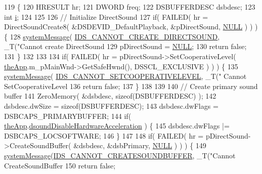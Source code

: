 \begin{DoxyCode}
119 \{
120     HRESULT hr;
121     DWORD freq;
122     DSBUFFERDESC dsbdesc;
123     \textcolor{keywordtype}{int} \mbox{\hyperlink{expr-lex_8cpp_acb559820d9ca11295b4500f179ef6392}{i}};
124 
125 
126     \textcolor{comment}{// Initialize DirectSound}
127     \textcolor{keywordflow}{if}( FAILED( hr = DirectSoundCreate8( &DSDEVID\_DefaultPlayback, &pDirectSound, 
      \mbox{\hyperlink{getopt1_8c_a070d2ce7b6bb7e5c05602aa8c308d0c4}{NULL}} ) ) ) \{
128         \mbox{\hyperlink{system_8cpp_a747a9cb8e015a3d45cca636b5bd0fc69}{systemMessage}}( \mbox{\hyperlink{resource_8h_a2cf080a47bcffd2fc082a28d3a81b8ad}{IDS\_CANNOT\_CREATE\_DIRECTSOUND}}, \_T(\textcolor{stringliteral}{"Cannot
       create DirectSound %
129         pDirectSound = \mbox{\hyperlink{getopt1_8c_a070d2ce7b6bb7e5c05602aa8c308d0c4}{NULL}};
130         \textcolor{keywordflow}{return} \textcolor{keyword}{false};
131     \}
132 
133 
134     \textcolor{keywordflow}{if}( FAILED( hr = pDirectSound->SetCooperativeLevel( \mbox{\hyperlink{_v_b_a_8cpp_a8095a9d06b37a7efe3723f3218ad8fb3}{theApp}}.m\_pMainWnd->GetSafeHwnd(), 
      DSSCL\_EXCLUSIVE ) ) ) \{
135         \mbox{\hyperlink{system_8cpp_a747a9cb8e015a3d45cca636b5bd0fc69}{systemMessage}}( \mbox{\hyperlink{resource_8h_a4df84f3d1f520bb71a7173be8a29d61b}{IDS\_CANNOT\_SETCOOPERATIVELEVEL}}, \_T(\textcolor{stringliteral}{"
      Cannot SetCooperativeLevel %
136         \textcolor{keywordflow}{return} \textcolor{keyword}{false};
137     \}
138 
139 
140     \textcolor{comment}{// Create primary sound buffer}
141     ZeroMemory( &dsbdesc, \textcolor{keyword}{sizeof}(DSBUFFERDESC) );
142     dsbdesc.dwSize = \textcolor{keyword}{sizeof}(DSBUFFERDESC);
143     dsbdesc.dwFlags = DSBCAPS\_PRIMARYBUFFER;
144     \textcolor{keywordflow}{if}( \mbox{\hyperlink{_v_b_a_8cpp_a8095a9d06b37a7efe3723f3218ad8fb3}{theApp}}.\mbox{\hyperlink{class_v_b_a_a58f89c52283d10a0fcaac8abb7eca524}{dsoundDisableHardwareAcceleration}} ) \{
145         dsbdesc.dwFlags |= DSBCAPS\_LOCSOFTWARE;
146     \}
147 
148     \textcolor{keywordflow}{if}( FAILED( hr = pDirectSound->CreateSoundBuffer( &dsbdesc, &dsbPrimary, 
      \mbox{\hyperlink{getopt1_8c_a070d2ce7b6bb7e5c05602aa8c308d0c4}{NULL}} ) ) ) \{
149         \mbox{\hyperlink{system_8cpp_a747a9cb8e015a3d45cca636b5bd0fc69}{systemMessage}}(\mbox{\hyperlink{resource_8h_af4f9815b1cc6df2200fd06bcf1eabd9e}{IDS\_CANNOT\_CREATESOUNDBUFFER}}, \_T(\textcolor{stringliteral}{"Cannot
       CreateSoundBuffer %
150         \textcolor{keywordflow}{return} \textcolor{keyword}{false};
}}}
\end{DoxyCode}

